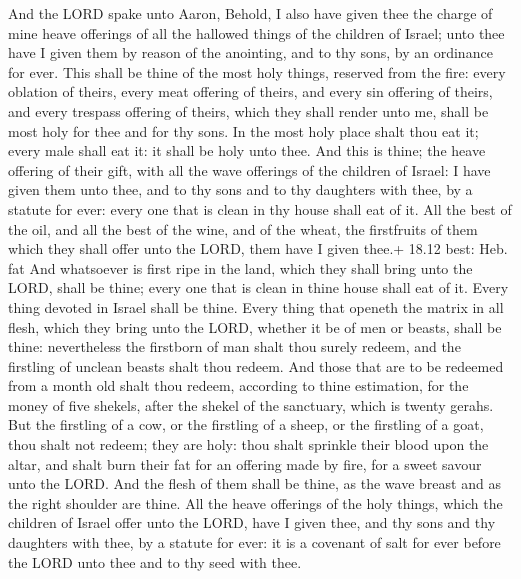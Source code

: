  And the LORD spake unto Aaron, Behold, I also have given
thee the charge of mine heave offerings of all the hallowed things of
the children of Israel; unto thee have I given them by reason of the
anointing, and to thy sons, by an ordinance for ever.  This
shall be thine of the most holy things, reserved from the fire: every
oblation of theirs, every meat offering of theirs, and every sin
offering of theirs, and every trespass offering of theirs, which they
shall render unto me, shall be most holy for thee and for thy sons.
 In the most holy place shalt thou eat it; every male shall
eat it: it shall be holy unto thee.  And this is thine; the
heave offering of their gift, with all the wave offerings of the
children of Israel: I have given them unto thee, and to thy sons and to
thy daughters with thee, by a statute for ever: every one that is clean
in thy house shall eat of it.  All the best of the oil, and
all the best of the wine, and of the wheat, the firstfruits of them
which they shall offer unto the LORD, them have I given thee.+ 18.12
best: Heb. fat  And whatsoever is first ripe in the land,
which they shall bring unto the LORD, shall be thine; every one that is
clean in thine house shall eat of it.  Every thing devoted
in Israel shall be thine.  Every thing that openeth the
matrix in all flesh, which they bring unto the LORD, whether it be of
men or beasts, shall be thine: nevertheless the firstborn of man shalt
thou surely redeem, and the firstling of unclean beasts shalt thou
redeem.  And those that are to be redeemed from a month old
shalt thou redeem, according to thine estimation, for the money of five
shekels, after the shekel of the sanctuary, which is twenty gerahs.
 But the firstling of a cow, or the firstling of a sheep,
or the firstling of a goat, thou shalt not redeem; they are holy: thou
shalt sprinkle their blood upon the altar, and shalt burn their fat for
an offering made by fire, for a sweet savour unto the LORD.
 And the flesh of them shall be thine, as the wave breast
and as the right shoulder are thine.  All the heave
offerings of the holy things, which the children of Israel offer unto
the LORD, have I given thee, and thy sons and thy daughters with thee,
by a statute for ever: it is a covenant of salt for ever before the LORD
unto thee and to thy seed with thee.

